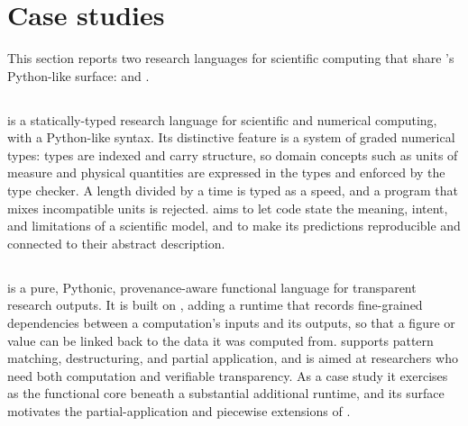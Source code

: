 \section{Case studies}
\label{sec:case-studies}

This section reports two research languages for scientific computing that share \PurePy's Python-like surface:
\Fortl and \Fluid. 

\subsection{\Fortl}
\label{sec:cs-fortl}

\Fortl is a statically-typed research language for scientific and numerical computing, with a Python-like
syntax. Its distinctive feature is a system of graded numerical types: types are indexed and carry structure,
so domain concepts such as units of measure and physical quantities are expressed in the types and enforced by
the type checker. A length divided by a time is typed as a speed, and a program that mixes incompatible units
is rejected. \Fortl aims to let code state the meaning, intent, and limitations of a scientific model, and to
make its predictions reproducible and connected to their abstract description. 

\subsection{\Fluid}
\label{sec:cs-fluid}

\Fluid is a pure, Pythonic, provenance-aware functional language for transparent research outputs. It is built
on \PurePy, adding a runtime that records fine-grained dependencies between a computation's inputs and its
outputs, so that a figure or value can be linked back to the data it was computed from. \Fluid supports pattern
matching, destructuring, and partial application, and is aimed at researchers who need both computation and
verifiable transparency. As a case study it exercises \PurePy as the functional core beneath a substantial
additional runtime, and its surface motivates the partial-application and piecewise extensions of
.
